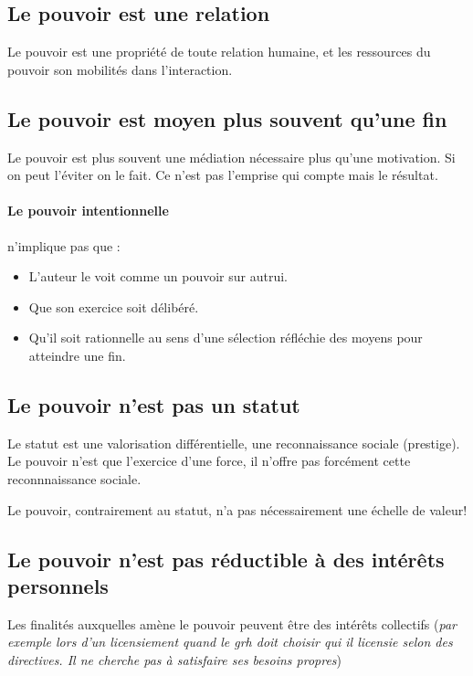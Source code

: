 \documentclass[11pt]{article} %
\begin{document}
\subsection{Le pouvoir est une relation}
Le pouvoir est une propriété de toute relation humaine, et les
ressources du pouvoir son mobilités dans l'interaction.

\subsection{Le pouvoir est moyen plus souvent qu'une fin}

Le pouvoir est plus souvent une médiation nécessaire plus qu'une
motivation. Si on peut l'éviter on le fait. Ce n'est pas l'emprise qui
compte mais le résultat.

\paragraph{Le pouvoir intentionnelle} n'implique pas que :
\begin{itemize}
	\item L'auteur le voit comme un pouvoir sur autrui.
	\item Que son exercice soit délibéré.
	\item Qu'il soit rationnelle au sens d'une sélection réfléchie des moyens pour atteindre une fin.
\end{itemize}


\subsection{Le pouvoir n'est pas un statut}

Le statut est une valorisation différentielle, une reconnaissance
sociale (prestige). Le pouvoir n'est que l'exercice d'une force, il
n'offre pas forcément cette reconnnaissance sociale.

Le pouvoir, contrairement au statut, n'a pas nécessairement une échelle
de valeur!

\subsection{Le pouvoir n'est pas réductible à des intérêts personnels}
Les finalités auxquelles amène le pouvoir peuvent être des intérêts
collectifs (\textit{par exemple lors d'un licensiement quand le grh doit
choisir qui il licensie selon des directives. Il ne cherche pas à
satisfaire ses besoins propres})
\end{document}
